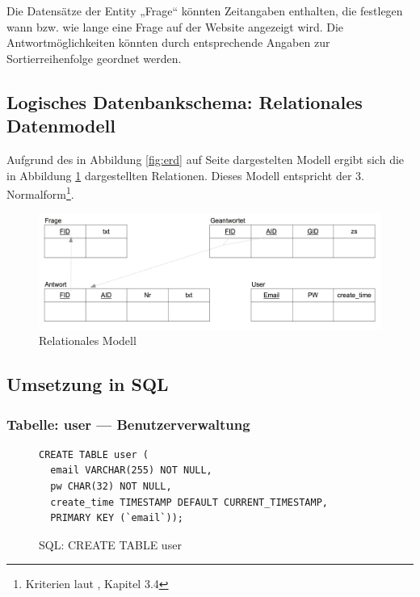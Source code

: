 Die Datensätze der Entity „Frage“ könnten Zeitangaben enthalten, die festlegen wann bzw. wie lange eine Frage auf der Website angezeigt wird. Die Antwortmöglichkeiten könnten durch entsprechende Angaben zur Sortierreihenfolge geordnet werden.

\subsection{Logisches Datenbankschema: Relationales Datenmodell}

Aufgrund des in Abbildung \ref{fig:erd} auf Seite \pageref{fig:erd} dargestelten Modell ergibt sich die in Abbildung \ref{fig:relmod} dargestellten Relationen. Dieses Modell entspricht der 3. Normalform\footnote{Kriterien laut \cite{dao101}, Kapitel 3.4}.

\begin{figure}[H]
\begin{center}
\includegraphics[width=\textwidth]{relmod.jpg}
\caption{Relationales Modell}
\label{fig:relmod}
\end{center}
\end{figure}

\subsection{Umsetzung in SQL}

\subsubsection{Tabelle: user --- Benutzerverwaltung}
\begin{figure}[H]
\begin{spacing}{1.0}
\begin{verbatim}
CREATE TABLE user (
  email VARCHAR(255) NOT NULL,
  pw CHAR(32) NOT NULL,
  create_time TIMESTAMP DEFAULT CURRENT_TIMESTAMP,
  PRIMARY KEY (`email`));
\end{verbatim}
\caption{SQL: CREATE TABLE user}
\label{sql:tbluser}
\end{spacing}
\end{figure}

